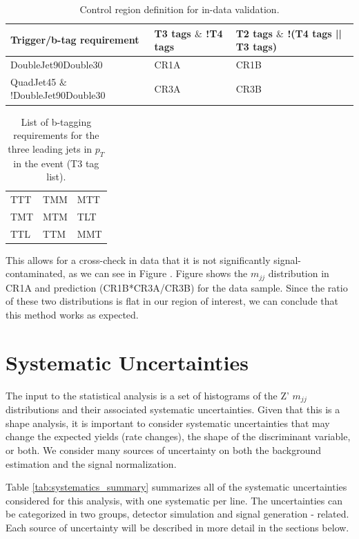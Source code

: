 \begin{table}[hbtp]\footnotesize
	\centering
	\begin{tabular}{l l l}
		\hline
		\textbf{Trigger/b-tag requirement} & T3 tags $\&$ !T4 tags & T2 tags $\&$ !(T4 tags || T3 tags) \\
		\hline
		DoubleJet90Double30 & CR1A & CR1B \\
		QuadJet45 $\&$!DoubleJet90Double30 & CR3A & CR3B \\
		\hline
	\end{tabular}
	\caption{Control region definition for in-data validation.}
	\label{tab:addtcr}
\end{table}

\begin{table}[hbtp]\footnotesize
	\centering
	\begin{tabular}{l|l|l}
		\hline
		TTT & TMM & MTT\\
		TMT & MTM & TLT\\
		TTL & TTM & MMT\\
		\hline
	\end{tabular}
	\caption{List of b-tagging requirements for the three leading jets in $p_{T}$ in the event (T3 tag list).}
	\label{tab:t3tag}
\end{table}

This allows for a cross-check in data that it is not significantly signal-contaminated, as we can see in Figure .
Figure shows the $m_{jj}$ distribution in CR1A and prediction (CR1B*CR3A/CR3B) for the data sample. Since the ratio of these two distributions is flat in our region of interest, we can conclude that this method works as expected.

\section{Systematic Uncertainties}
The input to the statistical analysis is a set of histograms of the Z' $m_{jj}$ distributions and their associated systematic uncertainties. Given that this is a shape analysis, it is important to consider systematic uncertainties that may change the expected yields (rate changes), the shape of the discriminant variable, or both. We consider many sources of uncertainty on both the background estimation and the signal normalization.

Table \ref{tab:systematics_summary} summarizes all of the systematic uncertainties considered for this analysis, with one systematic per line. The uncertainties can be categorized in two groups, detector simulation and signal generation - related. Each source of uncertainty will be described in more detail in the sections below.

